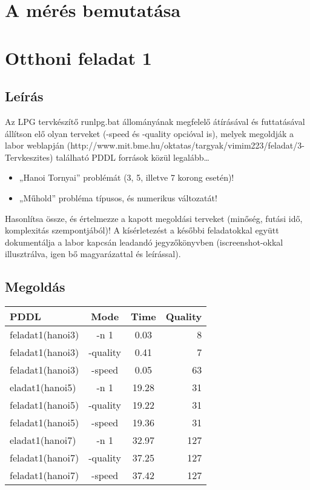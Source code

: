 
\section{A mérés bemutatása}


\section{Otthoni feladat 1}
\subsection{Leírás}
Az LPG tervkészítő runlpg.bat állományának megfelelő átírásával és futtatásával állítson elő olyan terveket (-speed és -quality opcióval is), melyek megoldják a labor weblapján (http://www.mit.bme.hu/oktatas/targyak/vimim223/feladat/3-Tervkeszites) található PDDL források közül legalább… 
\begin{itemize}
\item „Hanoi Tornyai” problémát (3, 5, illetve 7 korong esetén)! 
\item „Műhold” probléma típusos, és numerikus változatát!
\end{itemize}
Hasonlítsa össze, és értelmezze a kapott megoldási terveket (minőség, futási idő, komplexitás szempontjából)!  A kísérletezést a későbbi feladatokkal együtt dokumentálja a labor kapcsán leadandó jegyzőkönyvben (iscreenshot-okkal illusztrálva, igen bő magyarázattal és leírással). 
\subsection{Megoldás}

\begin{tabular}{ l | c | c | r }
	PDDL &  Mode &  Time & Quality \\ \hline
	feladat1(hanoi3) &  -n 1 &  0.03 &  8 \\
	feladat1(hanoi3) &   -quality &  0.41  &  7 \\
	feladat1(hanoi3) &   -speed &  0.05 &  63 \\
	eladat1(hanoi5) &  -n 1 & 19.28  & 31 \\
	feladat1(hanoi5) &   -quality & 19.22  & 31 \\
	feladat1(hanoi5) &   -speed &  19.36 &  31\\
	eladat1(hanoi7) &  -n 1 & 32.97   & 127 \\
	feladat1(hanoi7) &   -quality &  37.25 &  127\\
	feladat1(hanoi7) &   -speed & 37.42  & 127 \\
\end{tabular}


